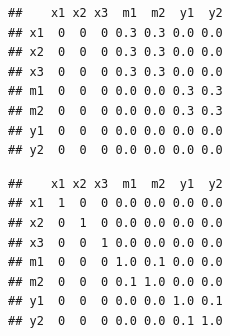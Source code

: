 \documentclass[]{article}
\newenvironment{Shaded}{\begin{snugshade}}{\end{snugshade}}
\newcommand{\KeywordTok}[1]{\textcolor[rgb]{0.13,0.29,0.53}{\textbf{#1}}}
\newcommand{\DataTypeTok}[1]{\textcolor[rgb]{0.13,0.29,0.53}{#1}}
\newcommand{\StringTok}[1]{\textcolor[rgb]{0.31,0.60,0.02}{#1}}
\newcommand{\OtherTok}[1]{\textcolor[rgb]{0.56,0.35,0.01}{#1}}
\newcommand{\OperatorTok}[1]{\textcolor[rgb]{0.81,0.36,0.00}{\textbf{#1}}}
\newcommand{\NormalTok}[1]{#1}
\begin{document}
\begin{Shaded}
\end{Shaded}

\begin{verbatim}
##    x1 x2 x3  m1  m2  y1  y2
## x1  0  0  0 0.3 0.3 0.0 0.0
## x2  0  0  0 0.3 0.3 0.0 0.0
## x3  0  0  0 0.3 0.3 0.0 0.0
## m1  0  0  0 0.0 0.0 0.3 0.3
## m2  0  0  0 0.0 0.0 0.3 0.3
## y1  0  0  0 0.0 0.0 0.0 0.0
## y2  0  0  0 0.0 0.0 0.0 0.0
\end{verbatim}

\begin{Shaded}
\end{Shaded}

\begin{verbatim}
##    x1 x2 x3  m1  m2  y1  y2
## x1  1  0  0 0.0 0.0 0.0 0.0
## x2  0  1  0 0.0 0.0 0.0 0.0
## x3  0  0  1 0.0 0.0 0.0 0.0
## m1  0  0  0 1.0 0.1 0.0 0.0
## m2  0  0  0 0.1 1.0 0.0 0.0
## y1  0  0  0 0.0 0.0 1.0 0.1
## y2  0  0  0 0.0 0.0 0.1 1.0
\end{verbatim}
\end{document}
